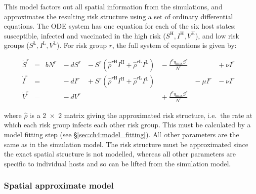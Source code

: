 This model factors out all spatial information from the simulations, and approximates the resulting risk structure using a set of ordinary differential equations. The ODE system has one equation for each of the six host states: susceptible, infected and vaccinated in the high risk ($S^\mathrm{H}, I^\mathrm{H}, V^\mathrm{H}$), and low risk groups ($S^\mathrm{L}, I^\mathrm{L}, V^\mathrm{L}$). For risk group $r$, the full system of equations is given by:
\begin{linenomath*}
\begin{equation}
\begin{alignedat}{7}
    \dot{S}^r &={} &bN^r &{}-{} dS^r &{}-{} S^r\left(\hat{\rho}^{r\mathrm{H}}I^{\mathrm{H}} + \hat{\rho}^{r\mathrm{L}}I^{\mathrm{L}}\right) &{}-{} \frac{f^r\eta{}_\mathrm{max}S^r}{N^r} &&{}+{} \nu{}I^r \\
    \dot{I}^r &={}  &&{}-{} dI^r &{}+{} S^r\left(\hat{\rho}^{r\mathrm{H}}I^{\mathrm{H}} + \hat{\rho}^{r\mathrm{L}}I^{\mathrm{L}}\right)& &{}-{} \mu{}I^r &{}-{} \nu{}I^r \\
    \dot{V}^r &={}  &&{}-{} dV^r &&{}+{} \frac{f^r\eta{}_\mathrm{max}S^r}{N^r}&&
\end{alignedat}
\label{eq:risk_model}
\end{equation}
\end{linenomath*}
where $\hat{\rho}$ is a \num{2x2} matrix giving the approximated risk structure, i.e.\ the rate at which each risk group infects each other risk group. This must be calculated by a model fitting step (see \S\ref{sec:ch4:model_fitting}). All other parameters are the same as in the simulation model. The risk structure must be approximated since the exact spatial structure is not modelled, whereas all other parameters are specific to individual hosts and so can be lifted from the simulation model.

\subsubsection*{Spatial approximate model}

